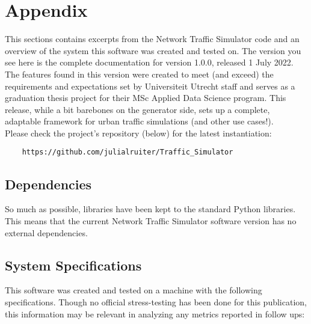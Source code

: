 \chapter{Appendix}
\label{Appendix}

\par This sections contains excerpts from the Network Traffic Simulator code and an overview of the system this software was created and tested on.  The version you see here is the complete documentation for version 1.0.0, released  1 July 2022.  \\

\noindent The features found in this version were created to meet (and exceed) the requirements and expectations set  by Universiteit Utrecht staff and serves as a graduation thesis project for their MSc Applied Data Science program.  This release, while a bit barebones on the generator side, sets up a complete, adaptable framework for urban traffic simulations (and other use cases!). \\

\noindent Please check the project's repository (below) for the latest instantiation:
\begin{verbatim}
    https://github.com/julialruiter/Traffic_Simulator
\end{verbatim} 

\section{Dependencies}
So much as possible, libraries have been kept to the standard Python libraries.  This means that the current Network Traffic Simulator software version has no external dependencies.

\section{System Specifications}
This software was created and tested on a machine with the following specifications.  Though no official stress-testing has been done for this publication, this information may be relevant in analyzing any metrics reported in follow ups: \\

